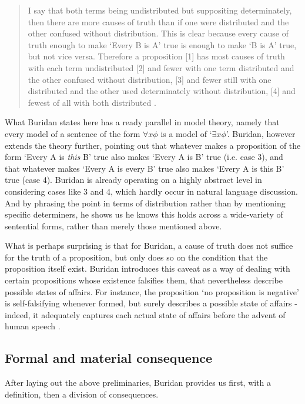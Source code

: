 \documentclass[]{article}
\begin{document}
\begin{quote}
I say that both terms being undistributed but suppositing determinately, then there are more causes of truth than if one were distributed and the other confused without distribution. This is clear because every cause of truth enough to make `Every B is A' true is enough to make `B is A' true, but not vice versa. Therefore a proposition [1] has most causes of truth with each term undistributed [2] and fewer with one term distributed and the other confused without distribution, [3] and fewer still with one distributed and the other used determinately without distribution, [4] and fewest of all with both distributed \cite[TC I. 2, 66]{Buridan2015}.
\end{quote}

What Buridan states here has a ready parallel in model theory, namely that every model of a sentence of the form $\forall x \phi$ is a model of `$\exists x \phi$'. Buridan, however extends the theory further, pointing out that whatever makes a proposition of the form `Every A is \textit{this} B' true also makes `Every A is B' true (i.e. case 3), and that whatever makes `Every A is every B' true also makes `Every A is this B' true (case 4). Buridan is already operating on a highly abstract level in considering cases like 3 and 4, which hardly occur in natural language discussion. And by phrasing the point in terms of distribution rather than by mentioning specific determiners, he shows us he knows this holds across a wide-variety of sentential forms, rather than merely those mentioned above.

What is perhaps surprising is that for Buridan, a cause of truth does not suffice for the truth of a proposition, but only does so on the condition that the proposition itself exist. Buridan introduces this caveat as a way of dealing with certain propositions whose existence falsifies them, that nevertheless describe possible states of affairs. For instance, the proposition `no proposition is negative' is self-falsifying whenever formed, but surely describes a possible state of affairs - indeed, it adequately captures each actual state of affairs before the advent of human speech \cite[TC I. 3]{Buridan2015}.
\subsection{Formal and material consequence}
After laying out the above preliminaries, Buridan provides us first, with a definition, then a division of consequences.
\end{document}
